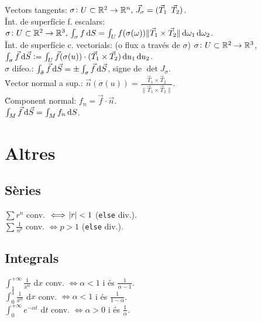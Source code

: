 \u{Vectors tangents}: $\sigma\colon U\subset\mathbb{R}^2 \to \mathbb{R}^n,\, \vec{J}_\sigma = (\vec{T}_1 \,\,\, \vec{T}_2)$. \\
\u{Int. de superf\'icie f. escalars}: $\sigma\colon U\subset\real^2\to\real^3,\, \int_\sigma f \dif S= \int_U f(\sigma(\omega)) \|\vec{T}_1 \times \vec{T}_2\| \dif\omega_1 \dif\omega_2$. \\
\u{Int. de superf\'icie c. vectorials}: (o flux a trav\'es de $\sigma$) $\sigma\colon U\subset\mathbb{R}^2\to\mathbb{R}^3$, $\int_\sigma \vec{f}\dif \vec{S} := \int_U \vec{f} (\sigma(u))\cdot(\vec{T}_1 \times \vec{T}_2) \dif u_1 \dif u_2$. \\
\u{$\sigma$ difeo.}: $\int_{\tilde{\sigma}} \vec{f} \dif \vec{S} = \pm \int_\sigma \vec{f} \dif \vec{S}$, signe de $\det J_\sigma$. \\
\u{Vector normal a sup.}: $\vec{n}(\sigma(u)) = \frac{\vec{T}_1\times\vec{T}_2}{\|\vec{T}_1\times \vec{T}_2\|}$. \\
\u{Component normal}: $f_n = \vec{f}\cdot\vec{n}$. \\
\ci $\int_M \vec{f} \dif\vec{S} = \int_M f_n \dif S$. \\


















\section{Altres}

\subsection{Sèries}
\ci $\sum r^n$ conv. $\iff \abs{r} < 1$ (\verb|else| div.). \\
\ci $\sum \frac{1}{n^p}$ conv. $\iff p > 1$ (\verb|else| div.).

\subsection{Integrals}
\ci $\int_1^{+\infty} \frac{1}{x^\alpha}$ d$x$ conv. $\iff \alpha < 1$ i és $\frac{1}{\alpha-1}$. \\
\ci $\int_0^1 \frac{1}{x^\alpha}$ d$x$ conv. $\iff \alpha < 1$ i és $\frac{1}{1-\alpha}$. \\
\ci $\int_0^{+\infty} e^{-\alpha t}$ d$t$ conv. $\iff \alpha > 0$ i és $\frac{1}{\alpha}$.

